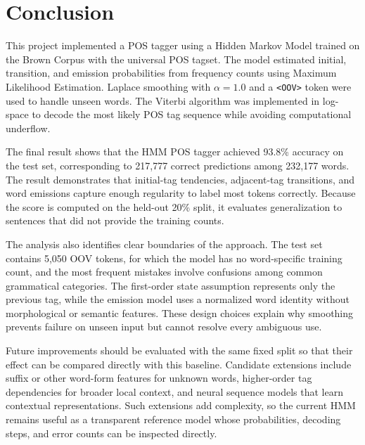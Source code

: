 \documentclass[12pt,a4paper]{article}
\begin{document}
\section{Conclusion}

This project implemented a POS tagger using a Hidden Markov Model trained on the
Brown Corpus with the universal POS tagset. The model estimated initial,
transition, and emission probabilities from frequency counts using Maximum
Likelihood Estimation. Laplace smoothing with $\alpha = 1.0$ and a
\texttt{\textless OOV\textgreater} token were used to handle unseen words. The
Viterbi algorithm was implemented in log-space to decode the most likely POS tag
sequence while avoiding computational underflow.

The final result shows that the HMM POS tagger achieved 93.8\% accuracy on the
test set, corresponding to 217,777 correct predictions among 232,177 words. The
result demonstrates that initial-tag tendencies, adjacent-tag transitions, and
word emissions capture enough regularity to label most tokens correctly. Because
the score is computed on the held-out 20\% split, it evaluates generalization to
sentences that did not provide the training counts.

The analysis also identifies clear boundaries of the approach. The test set
contains 5,050 OOV tokens, for which the model has no word-specific training
count, and the most frequent mistakes involve confusions among common grammatical
categories. The first-order state assumption represents only the previous tag,
while the emission model uses a normalized word identity without morphological
or semantic features. These design choices explain why smoothing prevents
failure on unseen input but cannot resolve every ambiguous use.

Future improvements should be evaluated with the same fixed split so that their
effect can be compared directly with this baseline. Candidate extensions include
suffix or other word-form features for unknown words, higher-order tag
dependencies for broader local context, and neural sequence models that learn
contextual representations. Such extensions add complexity, so the current HMM
remains useful as a transparent reference model whose probabilities, decoding
steps, and error counts can be inspected directly.
\end{document}
